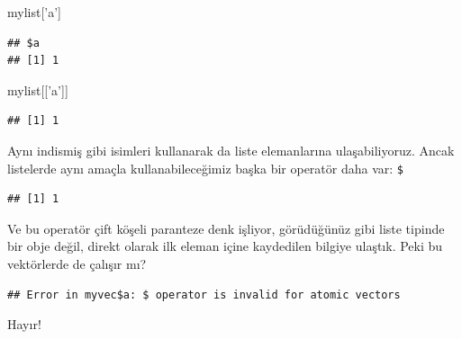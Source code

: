 \documentclass[]{book}
\newenvironment{Shaded}{\begin{snugshade}}{\end{snugshade}}
\newcommand{\NormalTok}[1]{#1}
\newcommand{\OperatorTok}[1]{\textcolor[rgb]{0.81,0.36,0.00}{\textbf{#1}}}
\newcommand{\StringTok}[1]{\textcolor[rgb]{0.31,0.60,0.02}{#1}}
\begin{document}
\begin{Shaded}
\begin{Highlighting}[]
\NormalTok{mylist[}\StringTok{'a'}\NormalTok{]}
\end{Highlighting}
\end{Shaded}

\begin{verbatim}
## $a
## [1] 1
\end{verbatim}

\begin{Shaded}
\begin{Highlighting}[]
\NormalTok{mylist[[}\StringTok{'a'}\NormalTok{]]}
\end{Highlighting}
\end{Shaded}

\begin{verbatim}
## [1] 1
\end{verbatim}

Aynı indismiş gibi isimleri kullanarak da liste elemanlarına
ulaşabiliyoruz. Ancak listelerde aynı amaçla kullanabileceğimiz başka
bir operatör daha var: \texttt{\$}

\begin{Shaded}
\end{Shaded}

\begin{verbatim}
## [1] 1
\end{verbatim}

Ve bu operatör çift köşeli paranteze denk işliyor, görüdüğünüz gibi
liste tipinde bir obje değil, direkt olarak ilk eleman içine kaydedilen
bilgiye ulaştık. Peki bu vektörlerde de çalışır mı?

\begin{Shaded}
\end{Shaded}

\begin{verbatim}
## Error in myvec$a: $ operator is invalid for atomic vectors
\end{verbatim}

Hayır!


\end{document}
